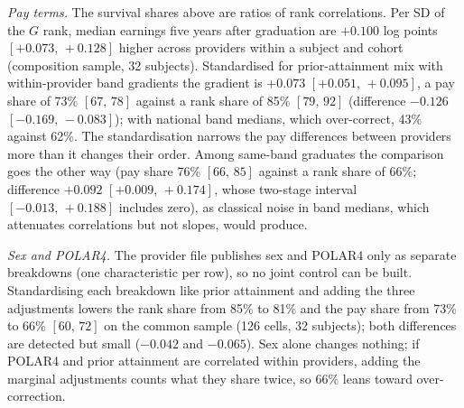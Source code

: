 \documentclass[11pt]{article}
\newcommand{\ci}[2]{$[#1,\allowbreak\,#2]$}
\begin{document}
\emph{Pay terms.} The survival shares above are ratios of rank correlations. Per SD of the $G$ rank, median earnings
five years after graduation are $+0.100$ log points \ci{+0.073}{+0.128} higher across providers within a subject and
cohort (composition sample, 32 subjects). Standardised for prior-attainment mix with within-provider band gradients
the gradient is $+0.073$ \ci{+0.051}{+0.095}, a pay share of 73\% \ci{67}{78} against a rank share of 85\%
\ci{79}{92} (difference $-0.126$ \ci{-0.169}{-0.083}); with national band medians, which over-correct, 43\% against
62\%. The standardisation narrows the pay differences between providers more than it changes their order. Among
same-band graduates the comparison goes the other way (pay share 76\% \ci{66}{85} against a rank share of 66\%;
difference $+0.092$ \ci{+0.009}{+0.174}, whose two-stage interval \ci{-0.013}{+0.188} includes zero), as classical
noise in band medians, which attenuates correlations but not slopes, would produce.

\emph{Sex and POLAR4.} The provider file publishes sex and POLAR4 only as separate breakdowns (one characteristic per
row), so no joint control can be built. Standardising each breakdown like prior attainment and adding the three
adjustments lowers the rank share from 85\% to 81\% and the pay share from 73\% to 66\% \ci{60}{72} on the common
sample (126 cells, 32 subjects); both differences are detected but small ($-0.042$ and $-0.065$). Sex alone changes
nothing; if POLAR4 and prior attainment are correlated within providers, adding the marginal adjustments counts what
they share twice, so 66\% leans toward over-correction.
\end{document}
